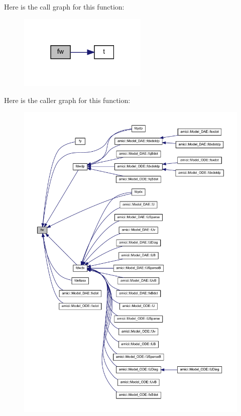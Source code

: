 Here is the call graph for this function\+:
\nopagebreak
\begin{figure}[H]
\begin{center}
\leavevmode
\includegraphics[width=174pt]{classamici_1_1_model_a7e63009c65fc1361cc5a6e1fc3d5ff1a_cgraph}
\end{center}
\end{figure}
Here is the caller graph for this function\+:
\nopagebreak
\begin{figure}[H]
\begin{center}
\leavevmode
\includegraphics[width=350pt]{classamici_1_1_model_a7e63009c65fc1361cc5a6e1fc3d5ff1a_icgraph}
\end{center}
\end{figure}
\mbox{\label{classamici_1_1_model_a7a8903313cd31dad4fa580c0e434bb1c}} 
